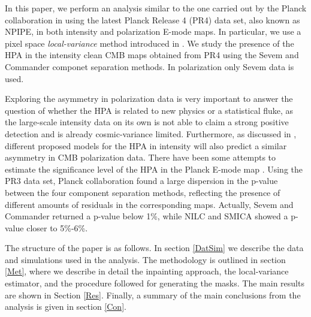 In this paper, we perform an analysis similar to the one carried out by the Planck collaboration in \cite{Planck:2019evm} using the latest Planck Release 4 (PR4) data set, also known as NPIPE, in both intensity and polarization E-mode maps. In particular, we use a pixel space \emph{local-variance} method introduced in \cite{Akrami:2014eta}. We study the presence of the HPA in the intensity clean CMB maps 
obtained from PR4 using the Sevem \cite{2012MNRAS.420.2162F} and Commander \cite{2008ApJ...676...10E} componet separation methods. In polarization only Sevem data is used.

Exploring the asymmetry in polarization data is very important to answer the question of whether the HPA is related to new physics or a statistical fluke, as the large-scale intensity data on its own is not able to claim a strong positive detection and is already cosmic-variance limited. Furthermore, as discussed in \cite{2020MNRAS.492.3994G}, different proposed models for the HPA in intensity will also predict a similar asymmetry in CMB polarization data.
There have been some attempts to estimate the significance level of the HPA in the Planck E-mode map \cite{2017arXiv171000580A, 2020MNRAS.492.3994G, Planck:2019evm}. Using the PR3 data set, Planck collaboration found a large dispersion in the p-value between the four component separation methods, reflecting the presence of different amounts of residuals in the corresponding maps. Actually, Sevem and Commander returned a p-value below 1\%, while NILC and SMICA showed a p-value closer to 5\%-6\%.

The structure of the paper is as follows. In section \ref{DatSim} we describe the data and simulations used in the analysis. The methodology is outlined in section \ref{Met}, where we describe in detail the inpainting approach, the local-variance estimator, and the procedure followed for generating the masks. The main results are shown in Section \ref{Res}. Finally, a summary of the main conclusions from the analysis is given in section \ref{Con}.
